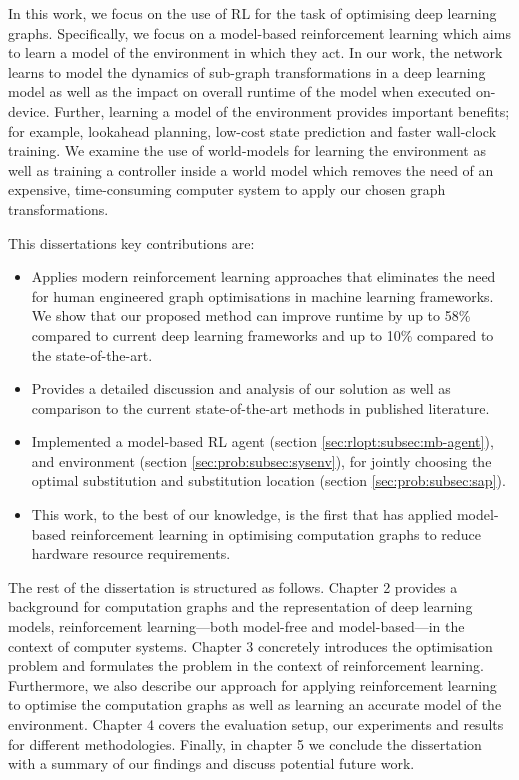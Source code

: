 In this work, we focus on the use of RL for the task of optimising deep learning graphs. Specifically, we focus on a model-based reinforcement learning which aims to learn a model of the environment in which they act. In our work, the network learns to model the dynamics of sub-graph transformations in a deep learning model as well as the impact on overall runtime of the model when executed on-device. Further, learning a model of the environment provides important benefits; for example, lookahead planning, low-cost state prediction and faster wall-clock training. We examine the use of world-models for learning the environment as well as training a controller inside a world model which removes the need of an expensive, time-consuming computer system to apply our chosen graph transformations.

This dissertations key contributions are:

\begin{itemize}
  \item Applies modern reinforcement learning approaches that eliminates the need for human engineered graph optimisations in machine learning frameworks. We show that our proposed method can improve runtime by up to 58\% compared to current deep learning frameworks and up to 10\% compared to the state-of-the-art.
  \item Provides a detailed discussion and analysis of our solution as well as comparison to the current state-of-the-art methods in published literature.
  \item Implemented a model-based RL agent (section \ref{sec:rlopt:subsec:mb-agent}), and environment (section \ref{sec:prob:subsec:sysenv}), for jointly choosing the optimal substitution and substitution location (section \ref{sec:prob:subsec:sap}).
  \item This work, to the best of our knowledge, is the first that has applied model-based reinforcement learning in optimising computation graphs to reduce hardware resource requirements.
\end{itemize}

The rest of the dissertation is structured as follows. Chapter 2 provides a background for computation graphs and the representation of deep learning models, reinforcement learning---both model-free and model-based---in the context of computer systems. Chapter 3 concretely introduces the optimisation problem and formulates the problem in the context of reinforcement learning. Furthermore, we also describe our approach for applying reinforcement learning to optimise the computation graphs as well as learning an accurate model of the environment. Chapter 4 covers the evaluation setup, our experiments and results for different methodologies. Finally, in chapter 5 we conclude the dissertation with a summary of our findings and discuss potential future work.